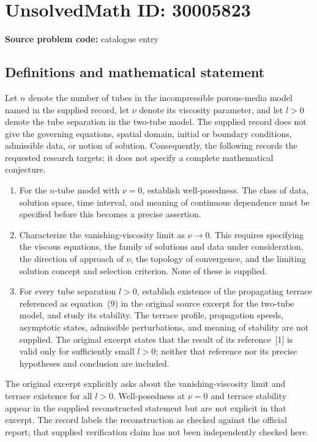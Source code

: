 \documentclass[11pt]{article}
\begin{document}
\section*{UnsolvedMath ID: 30005823}
\textbf{Source problem code:} catalogue entry
\subsection{Definitions and mathematical statement}
Let \(n\) denote the number of tubes in the incompressible porous-media model named in the supplied record, let \(\nu\) denote its viscosity parameter, and let \(l>0\) denote the tube separation in the two-tube model. The supplied record does not give the governing equations, spatial domain, initial or boundary conditions, admissible data, or notion of solution. Consequently, the following records the requested research targets; it does not specify a complete mathematical conjecture.

\begin{enumerate}
\item For the \(n\)-tube model with \(\nu=0\), establish well-posedness. The class of data, solution space, time interval, and meaning of continuous dependence must be specified before this becomes a precise assertion.
\item Characterize the vanishing-viscosity limit as \(\nu\to0\). This requires specifying the viscous equations, the family of solutions and data under consideration, the direction of approach of \(\nu\), the topology of convergence, and the limiting solution concept and selection criterion. None of these is supplied.
\item For every tube separation \(l>0\), establish existence of the propagating terrace referenced as equation~(9) in the original source excerpt for the two-tube model, and study its stability. The terrace profile, propagation speeds, asymptotic states, admissible perturbations, and meaning of stability are not supplied. The original excerpt states that the result of its reference~[1] is valid only for sufficiently small \(l>0\); neither that reference nor its precise hypotheses and conclusion are included.
\end{enumerate}

The original excerpt explicitly asks about the vanishing-viscosity limit and terrace existence for all \(l>0\). Well-posedness at \(\nu=0\) and terrace stability appear in the supplied reconstructed statement but are not explicit in that excerpt. The record labels the reconstruction as checked against the official report; that supplied verification claim has not been independently checked here.
\end{document}
